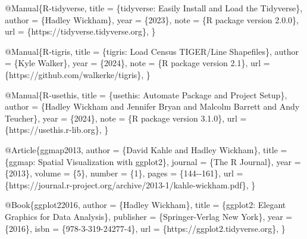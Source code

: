 \documentclass[
]{article}
\newenvironment{Shaded}{\begin{snugshade}}{\end{snugshade}}
\newcommand{\DataTypeTok}[1]{\textcolor[rgb]{0.13,0.29,0.53}{#1}}
\newcommand{\NormalTok}[1]{#1}
\newcommand{\OtherTok}[1]{\textcolor[rgb]{0.56,0.35,0.01}{#1}}
\newcommand{\VariableTok}[1]{\textcolor[rgb]{0.00,0.00,0.00}{#1}}
\begin{document}
\begin{Shaded}
\begin{Highlighting}[]
\VariableTok{@Manual}\NormalTok{\{}\OtherTok{R}\NormalTok{{-}}\OtherTok{tidyverse}\NormalTok{,}
  \DataTypeTok{title}\NormalTok{ = \{tidyverse: Easily Install and Load the Tidyverse\},}
  \DataTypeTok{author}\NormalTok{ = \{Hadley Wickham\},}
  \DataTypeTok{year}\NormalTok{ = \{2023\},}
  \DataTypeTok{note}\NormalTok{ = \{R package version 2.0.0\},}
  \DataTypeTok{url}\NormalTok{ = \{https://tidyverse.tidyverse.org\},}
\NormalTok{\}}

\VariableTok{@Manual}\NormalTok{\{}\OtherTok{R}\NormalTok{{-}}\OtherTok{tigris}\NormalTok{,}
  \DataTypeTok{title}\NormalTok{ = \{tigris: Load Census TIGER/Line Shapefiles\},}
  \DataTypeTok{author}\NormalTok{ = \{Kyle Walker\},}
  \DataTypeTok{year}\NormalTok{ = \{2024\},}
  \DataTypeTok{note}\NormalTok{ = \{R package version 2.1\},}
  \DataTypeTok{url}\NormalTok{ = \{https://github.com/walkerke/tigris\},}
\NormalTok{\}}

\VariableTok{@Manual}\NormalTok{\{}\OtherTok{R}\NormalTok{{-}}\OtherTok{usethis}\NormalTok{,}
  \DataTypeTok{title}\NormalTok{ = \{usethis: Automate Package and Project Setup\},}
  \DataTypeTok{author}\NormalTok{ = \{Hadley Wickham and Jennifer Bryan and Malcolm Barrett and Andy Teucher\},}
  \DataTypeTok{year}\NormalTok{ = \{2024\},}
  \DataTypeTok{note}\NormalTok{ = \{R package version 3.1.0\},}
  \DataTypeTok{url}\NormalTok{ = \{https://usethis.r{-}lib.org\},}
\NormalTok{\}}

\VariableTok{@Article}\NormalTok{\{}\OtherTok{ggmap2013}\NormalTok{,}
  \DataTypeTok{author}\NormalTok{ = \{David Kahle and Hadley Wickham\},}
  \DataTypeTok{title}\NormalTok{ = \{ggmap: Spatial Visualization with ggplot2\},}
  \DataTypeTok{journal}\NormalTok{ = \{The R Journal\},}
  \DataTypeTok{year}\NormalTok{ = \{2013\},}
  \DataTypeTok{volume}\NormalTok{ = \{5\},}
  \DataTypeTok{number}\NormalTok{ = \{1\},}
  \DataTypeTok{pages}\NormalTok{ = \{144{-}{-}161\},}
  \DataTypeTok{url}\NormalTok{ = \{https://journal.r{-}project.org/archive/2013{-}1/kahle{-}wickham.pdf\},}
\NormalTok{\}}

\VariableTok{@Book}\NormalTok{\{}\OtherTok{ggplot22016}\NormalTok{,}
  \DataTypeTok{author}\NormalTok{ = \{Hadley Wickham\},}
  \DataTypeTok{title}\NormalTok{ = \{ggplot2: Elegant Graphics for Data Analysis\},}
  \DataTypeTok{publisher}\NormalTok{ = \{Springer{-}Verlag New York\},}
  \DataTypeTok{year}\NormalTok{ = \{2016\},}
  \DataTypeTok{isbn}\NormalTok{ = \{978{-}3{-}319{-}24277{-}4\},}
  \DataTypeTok{url}\NormalTok{ = \{https://ggplot2.tidyverse.org\},}
\NormalTok{\}}


\end{Highlighting}
\end{Shaded}
\end{document}

